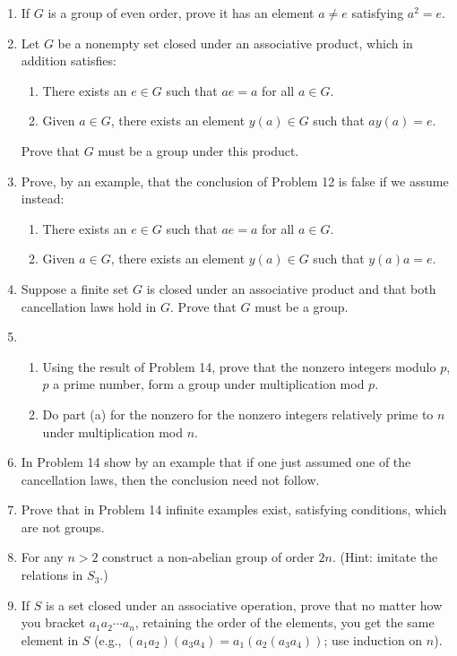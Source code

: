 \documentclass[twocolumn]{article}
\begin{document}
\begin{enumerate}
	\item
	If $G$ is a group of even order, prove it has an element $a \neq e$ satisfying $a^2 = e$.
	\item
	Let $G$ be a nonempty set closed under an associative product, which in addition satisfies:
	\begin{enumerate}
		\item
		There exists an $e \in G$ such that $ae = a$ for all $a \in G$.
		\item
		Given $a \in G$, there exists an element $y(a) \in G$ such that $ay(a) = e$.
	\end{enumerate}
	Prove that $G$ must be a group under this product.
	\item
	Prove, by an example, that the conclusion of Problem 12 is false if we assume instead:
	\begin{enumerate}
		\item
		There exists an $e \in G$ such that $ae = a$ for all $a \in G$.
		\item
		Given $a \in G$, there exists an element $y(a) \in G$ such that $y(a)a = e$.
	\end{enumerate}
	\item
	Suppose a finite set $G$ is closed under an associative product and that both cancellation laws hold in $G$. Prove that $G$ must be a group.
	\item
	\begin{enumerate}
		\item
		Using the result of Problem 14, prove that the nonzero integers modulo $p$, $p$ a prime number, form a group under multiplication mod $p$.
		\item
		Do part (a) for the nonzero for the nonzero integers relatively prime to $n$ under multiplication mod $n$.
	\end{enumerate}
	\item
	In Problem 14 show by an example that if one just assumed one of the cancellation laws, then the conclusion need not follow.
	\item
	Prove that in Problem 14 infinite examples exist, satisfying conditions, which are not groups.
	\item
	For any $n > 2$ construct a non-abelian group of order $2n$. (Hint: imitate the relations in $S_3$.)
	\item
	If $S$ is a set closed under an associative operation, prove that no matter how you bracket $a_1a_2 \cdots a_n$, retaining the order of the elements, you get the same element in $S$ (e.g., $(a_1a_2)(a_3a_4) = a_1(a_2(a_3a_4))$; use induction on $n$).
\end{enumerate}
\end{document}
